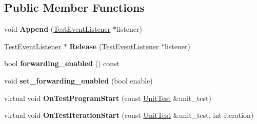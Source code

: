 \subsection*{Public Member Functions}
\begin{DoxyCompactItemize}
\item 
\mbox{\label{classtesting_1_1internal_1_1_test_event_repeater_ad154ce021881721a5c46994316b14cb1}} 
void {\bfseries Append} (\mbox{\hyperlink{classtesting_1_1_test_event_listener}{Test\+Event\+Listener}} $\ast$listener)
\item 
\mbox{\label{classtesting_1_1internal_1_1_test_event_repeater_ac77a3d127e4726e11694e4ee9cf3b793}} 
\mbox{\hyperlink{classtesting_1_1_test_event_listener}{Test\+Event\+Listener}} $\ast$ {\bfseries Release} (\mbox{\hyperlink{classtesting_1_1_test_event_listener}{Test\+Event\+Listener}} $\ast$listener)
\item 
\mbox{\label{classtesting_1_1internal_1_1_test_event_repeater_abaf2bfc453fc0e1005fcfb0f95deac4c}} 
bool {\bfseries forwarding\+\_\+enabled} () const
\item 
\mbox{\label{classtesting_1_1internal_1_1_test_event_repeater_a86c52e311b70598a385a0589277e92e0}} 
void {\bfseries set\+\_\+forwarding\+\_\+enabled} (bool enable)
\item 
\mbox{\label{classtesting_1_1internal_1_1_test_event_repeater_a15ee2ff051063088d3a89a266d5ffcc4}} 
virtual void {\bfseries On\+Test\+Program\+Start} (const \mbox{\hyperlink{classtesting_1_1_unit_test}{Unit\+Test}} \&unit\+\_\+test)
\item 
\mbox{\label{classtesting_1_1internal_1_1_test_event_repeater_a4062b3f070bb6531ab8494c13d3635d3}} 
virtual void {\bfseries On\+Test\+Iteration\+Start} (const \mbox{\hyperlink{classtesting_1_1_unit_test}{Unit\+Test}} \&unit\+\_\+test, int iteration)
\item 
\mbox{\label{classtesting_1_1internal_1_1_test_event_repeater_ae71819925adec0471fa7abc5072b8244}} 

\end{DoxyCompactItemize}
